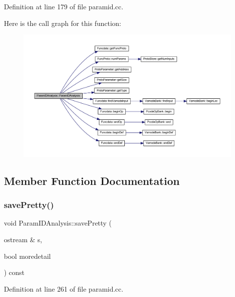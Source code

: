 Definition at line 179 of file paramid.\+cc.

Here is the call graph for this function\+:
\nopagebreak
\begin{figure}[H]
\begin{center}
\leavevmode
\includegraphics[width=350pt]{class_param_i_d_analysis_a5a269356a5e9c10b70a50d38f9cf877a_cgraph}
\end{center}
\end{figure}


\subsection{Member Function Documentation}
\mbox{\label{class_param_i_d_analysis_a188bdfa79597d13c285a1ff51976ce36}} 
\subsubsection{\texorpdfstring{savePretty()}{savePretty()}}
{\footnotesize\ttfamily void Param\+I\+D\+Analysis\+::save\+Pretty (\begin{DoxyParamCaption}\item[{ostream \&}]{s,  }\item[{bool}]{moredetail }\end{DoxyParamCaption}) const}



Definition at line 261 of file paramid.\+cc.

